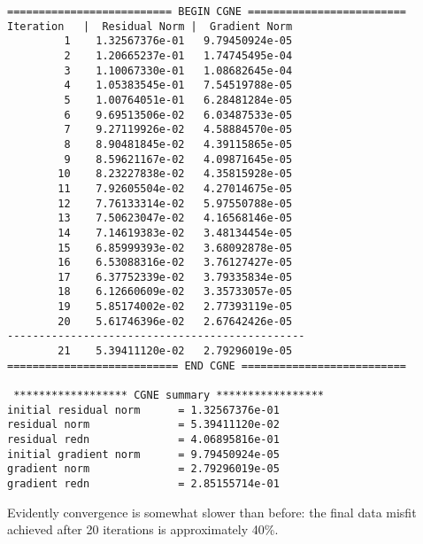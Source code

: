 \begin{verbatim}
========================== BEGIN CGNE =========================
Iteration   |  Residual Norm |  Gradient Norm
         1    1.32567376e-01   9.79450924e-05
         2    1.20665237e-01   1.74745495e-04
         3    1.10067330e-01   1.08682645e-04
         4    1.05383545e-01   7.54519788e-05
         5    1.00764051e-01   6.28481284e-05
         6    9.69513506e-02   6.03487533e-05
         7    9.27119926e-02   4.58884570e-05
         8    8.90481845e-02   4.39115865e-05
         9    8.59621167e-02   4.09871645e-05
        10    8.23227838e-02   4.35815928e-05
        11    7.92605504e-02   4.27014675e-05
        12    7.76133314e-02   5.97550788e-05
        13    7.50623047e-02   4.16568146e-05
        14    7.14619383e-02   3.48134454e-05
        15    6.85999393e-02   3.68092878e-05
        16    6.53088316e-02   3.76127427e-05
        17    6.37752339e-02   3.79335834e-05
        18    6.12660609e-02   3.35733057e-05
        19    5.85174002e-02   2.77393119e-05
        20    5.61746396e-02   2.67642426e-05
-----------------------------------------------
        21    5.39411120e-02   2.79296019e-05
=========================== END CGNE ==========================

 ****************** CGNE summary *****************  
initial residual norm      = 1.32567376e-01
residual norm              = 5.39411120e-02
residual redn              = 4.06895816e-01
initial gradient norm      = 9.79450924e-05
gradient norm              = 2.79296019e-05
gradient redn              = 2.85155714e-01

\end{verbatim}
Evidently convergence is somewhat slower than before: the final data
misfit achieved after 20 iterations is approximately 40\%.





